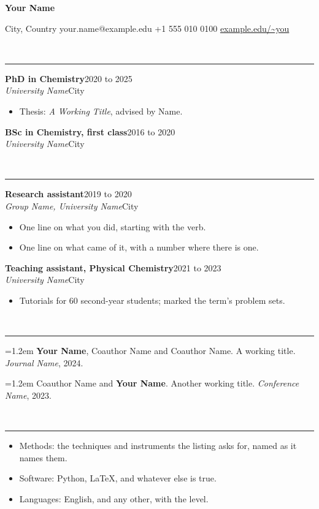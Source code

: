\documentclass[11pt]{article}
\newcommand{\heading}[1]{%
  \vspace{6pt}{\large\bfseries #1}\\[-9pt]\rule{\linewidth}{0.4pt}\par}
\newcommand{\entry}[4]{%
  \textbf{#1}\hfill #2\\\emph{#3}\hfill #4\par}
\newcommand{\paper}[1]{\hangindent=1.2em #1\par\vspace{2pt}}
\begin{document}
{\LARGE\bfseries Your Name}\par
\vspace{2pt}
City, Country \quad your.name@example.edu \quad +1 555 010 0100 \quad
\href{https://example.edu/~you}{example.edu/\textasciitilde you}

\heading{Education}

\entry{PhD in Chemistry}{2020 to 2025}{University Name}{City}
\begin{itemize}
  \item Thesis: \emph{A Working Title}, advised by Name.
\end{itemize}

\entry{BSc in Chemistry, first class}{2016 to 2020}{University Name}{City}

\heading{Experience}

\entry{Research assistant}{2019 to 2020}{Group Name, University Name}{City}
\begin{itemize}
  \item One line on what you did, starting with the verb.
  \item One line on what came of it, with a number where there is one.
\end{itemize}

\entry{Teaching assistant, Physical Chemistry}{2021 to 2023}{University Name}{City}
\begin{itemize}
  \item Tutorials for 60 second-year students; marked the term's problem sets.
\end{itemize}

\heading{Publications}

\paper{\textbf{Your Name}, Coauthor Name and Coauthor Name. A working title.
  \emph{Journal Name}, 2024.}
\paper{Coauthor Name and \textbf{Your Name}. Another working title.
  \emph{Conference Name}, 2023.}

\heading{Skills}

\begin{itemize}
  \item Methods: the techniques and instruments the listing asks for, named as it names them.
  \item Software: Python, LaTeX, and whatever else is true.
  \item Languages: English, and any other, with the level.
\end{itemize}
\end{document}

